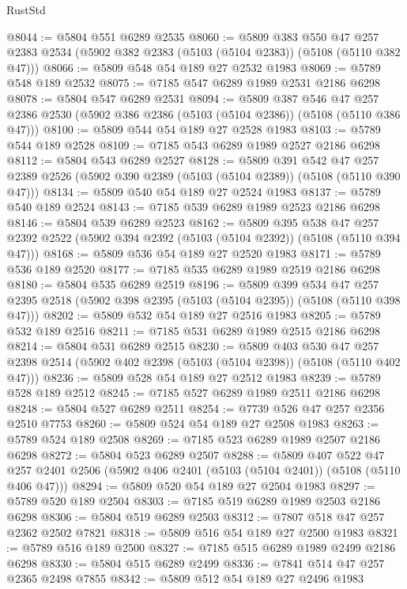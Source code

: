 \begin{lexlean}{RustStd}
\begin{coremodule}
@8044 := @5804 @551 @6289 @2535
@8060 := @5809
    @383
    @550
    @47
    @257
    @2383
    @2534
    (@5902 @382 @2383 (@5103 (@5104 @2383)) (@5108 (@5110 @382 @47)))
@8066 := @5809 @548 @54 @189 @27 @2532 @1983
@8069 := @5789 @548 @189 @2532
@8075 := @7185 @547 @6289 @1989 @2531 @2186 @6298
@8078 := @5804 @547 @6289 @2531
@8094 := @5809
    @387
    @546
    @47
    @257
    @2386
    @2530
    (@5902 @386 @2386 (@5103 (@5104 @2386)) (@5108 (@5110 @386 @47)))
@8100 := @5809 @544 @54 @189 @27 @2528 @1983
@8103 := @5789 @544 @189 @2528
@8109 := @7185 @543 @6289 @1989 @2527 @2186 @6298
@8112 := @5804 @543 @6289 @2527
@8128 := @5809
    @391
    @542
    @47
    @257
    @2389
    @2526
    (@5902 @390 @2389 (@5103 (@5104 @2389)) (@5108 (@5110 @390 @47)))
@8134 := @5809 @540 @54 @189 @27 @2524 @1983
@8137 := @5789 @540 @189 @2524
@8143 := @7185 @539 @6289 @1989 @2523 @2186 @6298
@8146 := @5804 @539 @6289 @2523
@8162 := @5809
    @395
    @538
    @47
    @257
    @2392
    @2522
    (@5902 @394 @2392 (@5103 (@5104 @2392)) (@5108 (@5110 @394 @47)))
@8168 := @5809 @536 @54 @189 @27 @2520 @1983
@8171 := @5789 @536 @189 @2520
@8177 := @7185 @535 @6289 @1989 @2519 @2186 @6298
@8180 := @5804 @535 @6289 @2519
@8196 := @5809
    @399
    @534
    @47
    @257
    @2395
    @2518
    (@5902 @398 @2395 (@5103 (@5104 @2395)) (@5108 (@5110 @398 @47)))
@8202 := @5809 @532 @54 @189 @27 @2516 @1983
@8205 := @5789 @532 @189 @2516
@8211 := @7185 @531 @6289 @1989 @2515 @2186 @6298
@8214 := @5804 @531 @6289 @2515
@8230 := @5809
    @403
    @530
    @47
    @257
    @2398
    @2514
    (@5902 @402 @2398 (@5103 (@5104 @2398)) (@5108 (@5110 @402 @47)))
@8236 := @5809 @528 @54 @189 @27 @2512 @1983
@8239 := @5789 @528 @189 @2512
@8245 := @7185 @527 @6289 @1989 @2511 @2186 @6298
@8248 := @5804 @527 @6289 @2511
@8254 := @7739 @526 @47 @257 @2356 @2510 @7753
@8260 := @5809 @524 @54 @189 @27 @2508 @1983
@8263 := @5789 @524 @189 @2508
@8269 := @7185 @523 @6289 @1989 @2507 @2186 @6298
@8272 := @5804 @523 @6289 @2507
@8288 := @5809
    @407
    @522
    @47
    @257
    @2401
    @2506
    (@5902 @406 @2401 (@5103 (@5104 @2401)) (@5108 (@5110 @406 @47)))
@8294 := @5809 @520 @54 @189 @27 @2504 @1983
@8297 := @5789 @520 @189 @2504
@8303 := @7185 @519 @6289 @1989 @2503 @2186 @6298
@8306 := @5804 @519 @6289 @2503
@8312 := @7807 @518 @47 @257 @2362 @2502 @7821
@8318 := @5809 @516 @54 @189 @27 @2500 @1983
@8321 := @5789 @516 @189 @2500
@8327 := @7185 @515 @6289 @1989 @2499 @2186 @6298
@8330 := @5804 @515 @6289 @2499
@8336 := @7841 @514 @47 @257 @2365 @2498 @7855
@8342 := @5809 @512 @54 @189 @27 @2496 @1983

\end{coremodule}
\end{lexlean}
